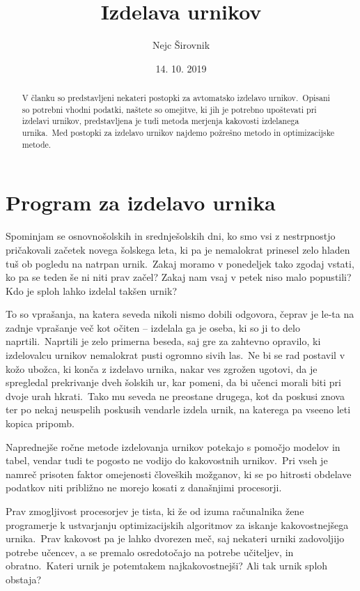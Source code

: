 \documentclass[a4paper,10pt]{article}
\begin{document}

\title{Izdelava urnikov}
\author{Nejc Širovnik}
\date{14. 10. 2019}
\maketitle

\begin{abstract}
V članku so predstavljeni nekateri postopki za avtomatsko izdelavo urnikov.\ Opisani so
potrebni vhodni podatki, naštete so omejitve, ki jih je potrebno upoštevati pri izdelavi
urnikov, predstavljena je tudi metoda merjenja kakovosti izdelanega urnika.\ Med postopki za izdelavo urnikov najdemo požrešno metodo in optimizacijske metode.
\end{abstract}

\section{Program za izdelavo urnika}

Spominjam se osnovnošolskih in srednješolskih dni, ko smo vsi z nestrpnostjo pričakovali
začetek novega šolskega leta, ki pa je nemalokrat prinesel zelo hladen tuš ob pogledu na
natrpan urnik.\ Zakaj moramo v ponedeljek tako zgodaj vstati, ko pa se teden še ni niti
prav začel? Zakaj nam vsaj v petek niso malo popustili? Kdo je sploh lahko izdelal
takšen urnik?

To so vprašanja, na katera seveda nikoli nismo dobili odgovora, čeprav je le-ta na zadnje
vprašanje več kot očiten -- izdelala ga je oseba, ki so ji to delo naprtili.\ Naprtili je
zelo primerna beseda, saj gre za zahtevno opravilo, ki izdelovalcu urnikov nemalokrat
pusti ogromno sivih las.\ Ne bi se rad postavil v kožo ubožca, ki konča z izdelavo urnika,
nakar ves zgrožen ugotovi, da je spregledal prekrivanje dveh šolskih ur, kar pomeni, da
bi učenci morali biti pri dvoje urah hkrati.\ Tako mu seveda ne preostane drugega, kot da
poskusi znova ter po nekaj neuspelih poskusih vendarle izdela urnik, na katerega pa vseeno
leti kopica pripomb.

Naprednejše ročne metode izdelovanja urnikov potekajo s pomočjo modelov in tabel, vendar
tudi te pogosto ne vodijo do kakovostnih urnikov.\ Pri vseh je namreč prisoten faktor
omejenosti človeških možganov, ki se po hitrosti obdelave podatkov niti približno ne
morejo kosati z današnjimi procesorji.

Prav zmogljivost procesorjev je tista, ki že od izuma računalnika žene programerje k
ustvarjanju optimizacijskih algoritmov za iskanje kakovostnejšega urnika.\ Prav kakovost
pa je lahko dvorezen meč, saj nekateri urniki zadovoljijo potrebe učencev, a se premalo
osredotočajo na potrebe učiteljev, in obratno.\ Kateri urnik je potemtakem najkakovostnejši?
Ali tak urnik sploh obstaja?
\end{document}
